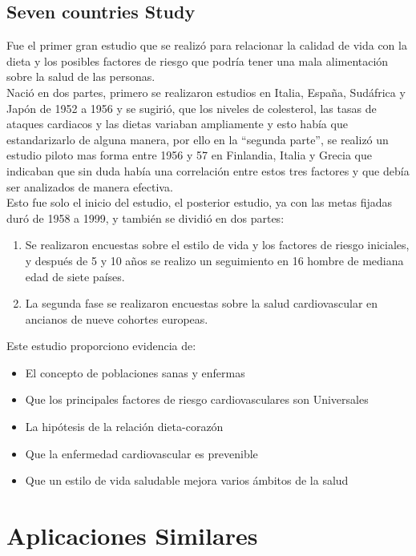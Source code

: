 \subsection{Seven countries Study \cite{sevenCountries}}
Fue el primer gran estudio que se realizó para relacionar la calidad de vida con la dieta y los posibles factores de riesgo que podría tener una mala alimentación sobre la salud de las personas.\\
Nació en dos partes, primero se realizaron estudios en Italia, España, Sudáfrica y Japón de 1952 a 1956 y se sugirió, que los niveles de colesterol, las tasas de ataques cardiacos y las dietas variaban ampliamente y esto había que estandarizarlo de alguna manera, por ello en la “segunda parte”, se realizó un estudio piloto mas forma entre 1956 y 57 en Finlandia, Italia y Grecia que indicaban que sin duda había una correlación entre estos tres factores y que debía ser analizados de manera efectiva.\\
Esto fue solo el inicio del estudio, el posterior estudio, ya con las metas fijadas duró de 1958 a 1999, y también se dividió en dos partes:\\
\begin{enumerate}
	\item Se realizaron encuestas sobre el estilo de vida y los factores de riesgo iniciales, y después de 5 y 10 años se realizo un seguimiento en 16 hombre de mediana edad de siete países.
	\item La segunda fase se realizaron encuestas sobre la salud cardiovascular en ancianos de nueve cohortes europeas.
\end{enumerate}
Este estudio proporciono evidencia de:
\begin{itemize}
\item El concepto de poblaciones sanas y enfermas
\item Que los principales factores de riesgo cardiovasculares son Universales
\item La hipótesis de la relación dieta-corazón
\item Que la enfermedad cardiovascular es prevenible
\item Que un estilo de vida saludable mejora varios ámbitos de la salud

\end{itemize}

\section{Aplicaciones Similares}
